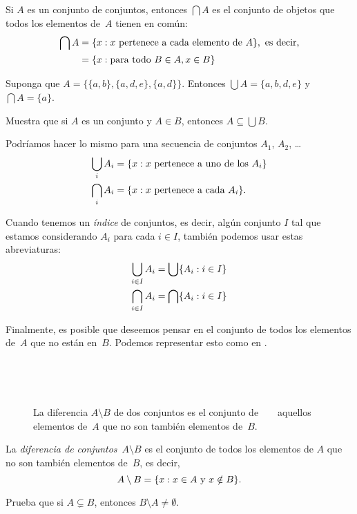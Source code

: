 \documentclass[../../../include/open-logic-section]{subfiles}
\begin{document}
\begin{defn}
Si $A$ es un conjunto de conjuntos, entonces $\bigcap A$ es el conjunto de objetos que todos los elementos de~$A$ tienen en común:
\begin{align*}
\bigcap A & = \Setabs{x}{x \text{ pertenece a cada elemento de } A},
\text{ es decir,}\\
 & = \Setabs{x}{\text{para todo } B \in A, x \in B}
\end{align*}
\end{defn}

\begin{ex}
Suponga que $A = \{ \{ a, b \}, \{ a, d, e \}, \{ a, d \} \}$.
Entonces $\bigcup A = \{ a, b, d, e \}$ y $\bigcap A = \{ a \}$.
\end{ex}
\begin{prob}
	Muestra que si $A$ es un conjunto y $A \in B$, entonces $A \subseteq \bigcup B$.
\end{prob}

Podríamos hacer lo mismo para una secuencia de conjuntos $A_1$, $A_2$, \dots
\begin{align*}
\bigcup_i A_i & = \{ x : x \text{ pertenece a uno de los } A_i \}\\
\bigcap_i A_i & = \{ x : x \text{ pertenece a cada } A_i \}.
\end{align*}

Cuando tenemos un \emph{índice} de conjuntos, es decir, algún conjunto $I$ tal que estamos considerando $A_i$ para cada $i \in I$, también podemos usar estas abreviaturas:
\begin{align*}
	\bigcup_{i \in I} A_i & = \bigcup \{ A_i  : i \in I \}\\
	\bigcap_{i \in I} A_i & = \bigcap\{ A_i : i \in I \}
\end{align*}

Finalmente, es posible que deseemos pensar en el conjunto de todos los elementos de~$A$ que no están en~$B$. Podemos representar esto como en .

\begin{figure}
  \caption{La diferencia $A \setminus B$ de dos conjuntos es el conjunto de
    aquellos elementos de~$A$ que no son también elementos de~$B$.}
\end{figure}

\begin{defn}[Diferencia]
La \emph{diferencia de conjuntos}~$A \setminus B$ es el conjunto de todos los elementos de $A$ que no son también elementos de~$B$, es decir,
\[
A\setminus B = \{ x : x\in A \text{ y } x \notin B \}.
\]
\end{defn}

\begin{prob}
	Prueba que si $A \subsetneq B$, entonces $B \setminus A \neq \emptyset$.
\end{prob}
\end{document}
